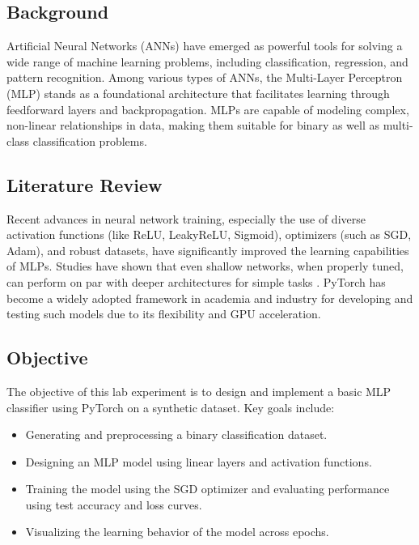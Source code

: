 \documentclass[a4paper, journal]{IEEEtran}
\begin{document}
\subsection{Background}
Artificial Neural Networks (ANNs) have emerged as powerful tools for solving a wide range of machine learning problems, including classification, regression, and pattern recognition. Among various types of ANNs, the Multi-Layer Perceptron (MLP) \cite{minsky1969perceptrons} stands as a foundational architecture that facilitates learning through feedforward layers and backpropagation. MLPs are capable of modeling complex, non-linear relationships in data, making them suitable for binary as well as multi-class classification problems.

\subsection{Literature Review}
Recent advances in neural network training, especially the use of diverse activation functions (like ReLU, LeakyReLU, Sigmoid), optimizers (such as SGD, Adam), and robust datasets, have significantly improved the learning capabilities of MLPs. Studies have shown that even shallow networks, when properly tuned, can perform on par with deeper architectures for simple tasks \cite{goodfellow2016deep}. PyTorch \cite{paszke2019pytorch} has become a widely adopted framework in academia and industry for developing and testing such models due to its flexibility and GPU acceleration.

\subsection{Objective}
The objective of this lab experiment is to design and implement a basic MLP classifier using PyTorch on a synthetic dataset. Key goals include:
\begin{itemize}
    \item Generating and preprocessing a binary classification dataset.
    \item Designing an MLP model using linear layers and activation functions.
    \item Training the model using the SGD optimizer and evaluating performance using test accuracy and loss curves.
    \item Visualizing the learning behavior of the model across epochs.
\end{itemize}



\end{document}
